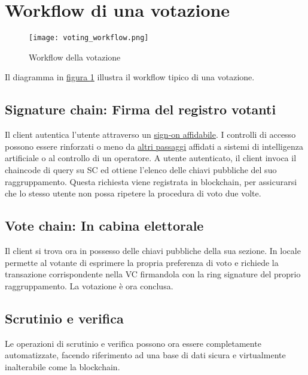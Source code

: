 \section{Workflow di una votazione}
	\begin{figure}[ht]
		\centering
		\texttt{[image: voting\_workflow.png]}
		\caption{Workflow della votazione}
		\label{fig:voting_workflow}
	\end{figure}
	Il diagramma in \hyperref[fig:voting_workflow]{figura \ref*{fig:voting_workflow}} illustra il workflow tipico di una votazione.
	\subsection{Signature chain: Firma del registro votanti}
		Il client autentica l'utente attraverso un \hyperref[subsec:personalita_voto]{sign-on affidabile}. I controlli di accesso possono essere rinforzati o meno da \hyperref[subsec:liberta_voto]{altri passaggi} affidati a sistemi di intelligenza artificiale o al controllo di un operatore. A utente autenticato, il client invoca il chaincode di query su SC ed ottiene l'elenco delle chiavi pubbliche del suo raggruppamento. Questa richiesta viene registrata in blockchain, per assicurarsi che lo stesso utente non possa ripetere la procedura di voto due volte.

	\subsection{Vote chain: In cabina elettorale}
		Il client si trova ora in possesso delle chiavi pubbliche della sua sezione. In locale permette al votante di esprimere la propria preferenza di voto e richiede la transazione corrispondente nella VC firmandola con la ring signature del proprio raggruppamento.
		La votazione è ora conclusa.

	\subsection{Scrutinio e verifica}
		Le operazioni di scrutinio e verifica possono ora essere completamente automatizzate, facendo riferimento ad una base di dati sicura e virtualmente inalterabile come la blockchain.